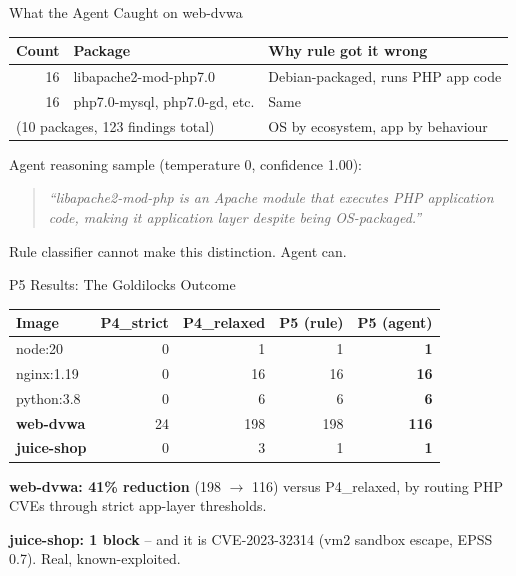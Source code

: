 \documentclass[aspectratio=169]{beamer}
\begin{document}
\begin{frame}{What the Agent Caught on web-dvwa}
\small
\begin{tabular}{rll}
\toprule
Count & Package & Why rule got it wrong \\
\midrule
16 & libapache2-mod-php7.0 & Debian-packaged, runs PHP app code \\
16 & php7.0-mysql, php7.0-gd, etc. & Same \\
\multicolumn{2}{l}{(10 packages, 123 findings total)} & OS by ecosystem, app by behaviour \\
\bottomrule
\end{tabular}

\medskip
Agent reasoning sample (temperature 0, confidence 1.00):

\medskip
\begin{quote}
\textit{``libapache2-mod-php is an Apache module that executes PHP application code, making it application layer despite being OS-packaged.''}
\end{quote}

\medskip
Rule classifier cannot make this distinction. Agent can.
\end{frame}

\begin{frame}{P5 Results: The Goldilocks Outcome}
\small
\begin{tabular}{lrrrr}
\toprule
Image & P4\_strict & P4\_relaxed & P5 (rule) & \textbf{P5 (agent)} \\
\midrule
node:20 & 0 & 1 & 1 & \textbf{1} \\
nginx:1.19 & 0 & 16 & 16 & \textbf{16} \\
python:3.8 & 0 & 6 & 6 & \textbf{6} \\
\textbf{web-dvwa} & 24 & 198 & 198 & \textbf{116} \\
\textbf{juice-shop} & 0 & 3 & 1 & \textbf{1} \\
\bottomrule
\end{tabular}

\medskip
\textbf{web-dvwa: 41\% reduction} (198 $\to$ 116) versus P4\_relaxed, by routing PHP CVEs through strict app-layer thresholds.

\medskip
\textbf{juice-shop: 1 block} -- and it is CVE-2023-32314 (vm2 sandbox escape, EPSS 0.7). Real, known-exploited.
\end{frame}
\end{document}
